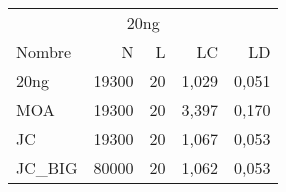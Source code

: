 \begin{tabular}{lrrrr}
	\toprule
	\multicolumn{5}{c}{20ng}             \\[3pt]
	Nombre  & N     & L  & LC    & LD    \\
	\midrule
	20ng    & 19300 & 20 & 1,029 & 0,051 \\[3pt]
	MOA     & 19300 & 20 & 3,397 & 0,170 \\[3pt]
	JC      & 19300 & 20 & 1,067 & 0,053 \\[3pt]
	JC\_BIG & 80000 & 20 & 1,062 & 0,053 \\
	\bottomrule
\end{tabular}
